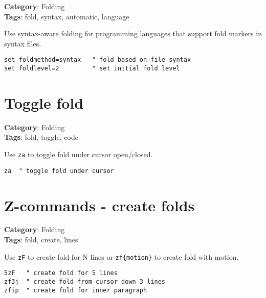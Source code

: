 {{{{{\textbf{Category}: Folding\\ \textbf{Tags}: fold, syntax, automatic, language
\vspace{0.5cm}

Use syntax-aware folding for programming languages that support fold markers in syntax files.

\begin{Exa*}{}
\begin{Verbatim}[fontsize=\footnotesize, breaklines, breakanywhere]
set foldmethod=syntax   " fold based on file syntax
set foldlevel=2         " set initial fold level
\end{Verbatim}
\end{Exa*}

\section{Toggle fold}

\textbf{Category}: Folding\\ \textbf{Tags}: fold, toggle, code
\vspace{0.5cm}

Use {\footnotesize \Verb§za§} to toggle fold under cursor open/closed.

\begin{Exa*}{}
\begin{Verbatim}[fontsize=\footnotesize, breaklines, breakanywhere]
za  " toggle fold under cursor
\end{Verbatim}
\end{Exa*}

\section{Z-commands - create folds}

\textbf{Category}: Folding\\ \textbf{Tags}: fold, create, lines
\vspace{0.5cm}

Use {\footnotesize \Verb§zF§} to create fold for N lines or {\footnotesize \Verb§zf{motion}§} to create fold with motion.

\begin{Exa*}{}
\begin{Verbatim}[fontsize=\footnotesize, breaklines, breakanywhere]
5zF   " create fold for 5 lines
zf3j  " create fold from cursor down 3 lines
zfip  " create fold for inner paragraph
\end{Verbatim}
\end{Exa*}

}}}}}
